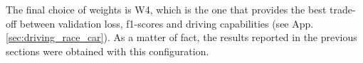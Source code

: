 


\noindent The final choice of weights is W4, which is the one that provides the best trade-off between validation loss, f1-scores and driving capabilities (see App. \ref{sec:driving_race_car}). As a matter of fact, the results reported in the previous sections were obtained with this configuration.